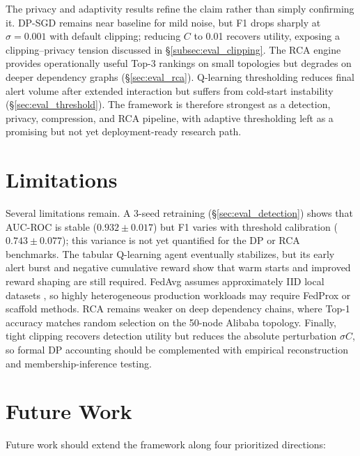 The privacy and adaptivity results refine the claim rather than simply
confirming it. DP-SGD remains near baseline for mild noise, but F1 drops
sharply at $\sigma{=}0.001$ with default clipping; reducing $C$ to 0.01
recovers utility, exposing a clipping--privacy tension discussed in
\S\ref{subsec:eval_clipping}. The RCA engine provides operationally useful
Top-3 rankings on small topologies but degrades on deeper dependency graphs
(\S\ref{sec:eval_rca}). Q-learning thresholding reduces final alert volume
after extended interaction but suffers from cold-start instability
(\S\ref{sec:eval_threshold}). The framework is therefore strongest as a
detection, privacy, compression, and RCA pipeline, with adaptive thresholding
left as a promising but not yet deployment-ready research path.

\section{Limitations}
\label{sec:conclusion_limitations}

Several limitations remain. A 3-seed retraining
(\S\ref{sec:eval_detection}) shows that AUC-ROC is stable
($0.932 \pm 0.017$) but F1 varies with threshold calibration
($0.743 \pm 0.077$); this variance is not yet quantified for the DP
or RCA benchmarks.
The tabular Q-learning agent eventually stabilizes, but its early alert burst
and negative cumulative reward show that warm starts and improved reward
shaping are still required. FedAvg assumes approximately IID local datasets
\cite{li2020federated}, so highly heterogeneous production workloads may
require FedProx or scaffold methods. RCA remains weaker on deep dependency
chains, where Top-1 accuracy matches random selection on the 50-node Alibaba
topology. Finally, tight clipping recovers detection utility but reduces the
absolute perturbation $\sigma C$, so formal DP accounting should be
complemented with empirical reconstruction and membership-inference testing.

\section{Future Work}
\label{sec:conclusion_future}

Future work should extend the framework along four prioritized directions:

